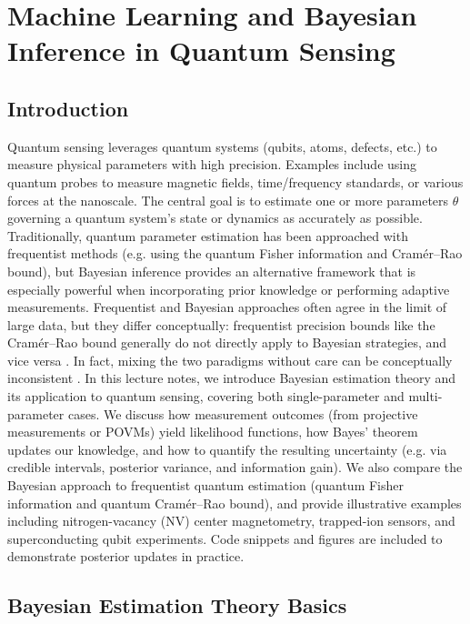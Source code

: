 \chapter{Machine Learning and Bayesian Inference in Quantum Sensing}

\section{Introduction}

Quantum sensing leverages quantum systems (qubits, atoms, defects,
etc.) to measure physical parameters with high precision. Examples
include using quantum probes to measure magnetic fields,
time/frequency standards, or various forces at the nanoscale. The
central goal is to estimate one or more parameters $\theta$ governing
a quantum system’s state or dynamics as accurately as
possible. Traditionally, quantum parameter estimation has been
approached with frequentist methods (e.g. using the quantum Fisher
information and Cramér–Rao bound), but Bayesian inference provides an
alternative framework that is especially powerful when incorporating
prior knowledge or performing adaptive measurements. Frequentist and
Bayesian approaches often agree in the limit of large data, but they
differ conceptually: frequentist precision bounds like the Cramér–Rao
bound generally do not directly apply to Bayesian strategies, and vice
versa . In fact, mixing the two paradigms without care can be
conceptually inconsistent . In this lecture notes, we introduce
Bayesian estimation theory and its application to quantum sensing,
covering both single-parameter and multi-parameter cases. We discuss
how measurement outcomes (from projective measurements or POVMs) yield
likelihood functions, how Bayes’ theorem updates our knowledge, and
how to quantify the resulting uncertainty (e.g. via credible
intervals, posterior variance, and information gain). We also compare
the Bayesian approach to frequentist quantum estimation (quantum
Fisher information and quantum Cramér–Rao bound), and provide
illustrative examples including nitrogen-vacancy (NV) center
magnetometry, trapped-ion sensors, and superconducting qubit
experiments. Code snippets and figures are included to demonstrate
posterior updates in practice.



\section{Bayesian Estimation Theory Basics}

